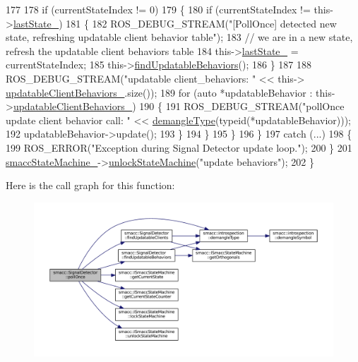 \begin{DoxyCode}
177 
178             \textcolor{keywordflow}{if} (currentStateIndex != 0)
179             \{
180                 \textcolor{keywordflow}{if} (currentStateIndex != this->\hyperlink{classsmacc_1_1SignalDetector_a72293ed0e98f4200fbe75b53f1e41eab}{lastState\_})
181                 \{
182                     ROS\_DEBUG\_STREAM(\textcolor{stringliteral}{"[PollOnce] detected new state, refreshing updatable client behavior
       table"});
183                     \textcolor{comment}{// we are in a new state, refresh the updatable client behaviors table}
184                     this->\hyperlink{classsmacc_1_1SignalDetector_a72293ed0e98f4200fbe75b53f1e41eab}{lastState\_} = currentStateIndex;
185                     this->\hyperlink{classsmacc_1_1SignalDetector_a7e1301b9d23a522f18385368421c83f5}{findUpdatableBehaviors}();
186                 \}
187 
188                 ROS\_DEBUG\_STREAM(\textcolor{stringliteral}{"updatable client\_behaviors: "} << this->
      \hyperlink{classsmacc_1_1SignalDetector_a9dce129da8c8a9971416a8f498132c23}{updatableClientBehaviors\_}.size());
189                 \textcolor{keywordflow}{for} (\textcolor{keyword}{auto} *updatableBehavior : this->\hyperlink{classsmacc_1_1SignalDetector_a9dce129da8c8a9971416a8f498132c23}{updatableClientBehaviors\_})
190                 \{
191                     ROS\_DEBUG\_STREAM(\textcolor{stringliteral}{"pollOnce update client behavior call: "} << 
      \hyperlink{namespacesmacc_1_1introspection_a670e39ccea29952859df4e2d0e45077b}{demangleType}(\textcolor{keyword}{typeid}(*updatableBehavior)));
192                     updatableBehavior->update();
193                 \}
194             \}
195         \}
196     \}
197     \textcolor{keywordflow}{catch} (...)
198     \{
199         ROS\_ERROR(\textcolor{stringliteral}{"Exception during Signal Detector update loop."});
200     \}
201     \hyperlink{classsmacc_1_1SignalDetector_a46025de6ac7b5980e22144f9703236a4}{smaccStateMachine\_}->\hyperlink{classsmacc_1_1ISmaccStateMachine_ae2e3ceb87bfe3f9d8bf320e36071fdc7}{unlockStateMachine}(\textcolor{stringliteral}{"update behaviors"});
202 \}
\end{DoxyCode}
Here is the call graph for this function\+:
\nopagebreak
\begin{figure}[H]
\begin{center}
\leavevmode
\includegraphics[width=350pt]{classsmacc_1_1SignalDetector_a9a116479e23259f3a5d5d4a47278afd5_cgraph}
\end{center}
\end{figure}
